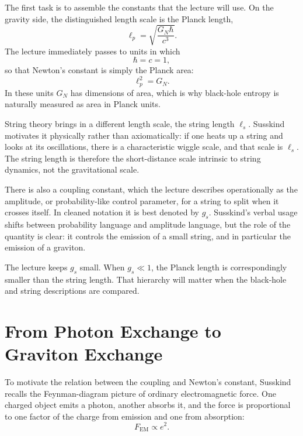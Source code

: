 The first task is to assemble the constants that the lecture will use. On the gravity side, the distinguished length scale is the Planck length,
\begin{equation}
\ell_p=\sqrt{\frac{G_N\hbar}{c^3}}.
\end{equation}
The lecture immediately passes to units in which
\begin{equation}
\hbar=c=1,
\end{equation}
so that Newton's constant is simply the Planck area:
\begin{equation}
\ell_p^2=G_N.
\end{equation}
In these units \(G_N\) has dimensions of area, which is why black-hole entropy is naturally measured as area in Planck units.

String theory brings in a different length scale, the string length \(\ell_s\). Susskind motivates it physically rather than axiomatically: if one heats up a string and looks at its oscillations, there is a characteristic wiggle scale, and that scale is \(\ell_s\). The string length is therefore the short-distance scale intrinsic to string dynamics, not the gravitational scale.

There is also a coupling constant, which the lecture describes operationally as the amplitude, or probability-like control parameter, for a string to split when it crosses itself. In cleaned notation it is best denoted by \(g_s\). Susskind's verbal usage shifts between probability language and amplitude language, but the role of the quantity is clear: it controls the emission of a small string, and in particular the emission of a graviton.

The lecture keeps \(g_s\) small. When \(g_s\ll 1\), the Planck length is correspondingly smaller than the string length. That hierarchy will matter when the black-hole and string descriptions are compared.

\section{From Photon Exchange to Graviton Exchange}

To motivate the relation between the coupling and Newton's constant, Susskind recalls the Feynman-diagram picture of ordinary electromagnetic force. One charged object emits a photon, another absorbs it, and the force is proportional to one factor of the charge from emission and one from absorption:
\begin{equation}
F_{\mathrm{EM}}\propto e^2.
\end{equation}


